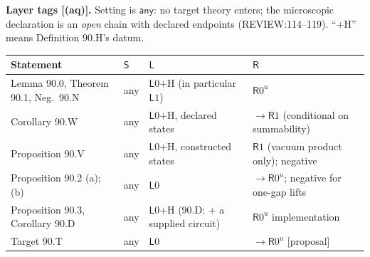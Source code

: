 \textbf{Layer tags [(aq)].}  Setting is \(\mathsf{any}\): no target theory enters; the microscopic declaration is an
\emph{open} chain with declared endpoints (REVIEW:114--119).  ``\(+\)H'' means Definition 90.H's datum.
\begin{center}\footnotesize
\begin{tabular}{p{4.4cm}p{1.0cm}p{4.4cm}p{4.2cm}}
\toprule
Statement & \(\mathsf S\) & \(\mathsf L\) & \(\mathsf R\) \\
\midrule
Lemma 90.0, Theorem 90.1, Neg.\ 90.N & any & \(\mathsf L0\)+H (in particular \(\mathsf L1\)) & \(\mathsf R0^{u}\) \\
Corollary 90.W & any & \(\mathsf L0\)+H, declared states & \(\to\mathsf R1\) (conditional on summability) \\
Proposition 90.V & any & \(\mathsf L0\)+H, constructed states & \(\mathsf R1\) (vacuum product only); negative \\
Proposition 90.2 (a); (b) & any & \(\mathsf L0\) & \(\to\mathsf R0^{u}\); negative for one-gap lifts \\
Proposition 90.3, Corollary 90.D & any & \(\mathsf L0\)+H (90.D: \(+\) a supplied circuit) & \(\mathsf R0^{u}\) implementation \\
Target 90.T & any & \(\mathsf L0\) & \(\to\mathsf R0^{u}\) [proposal] \\
\bottomrule
\end{tabular}
\end{center}


